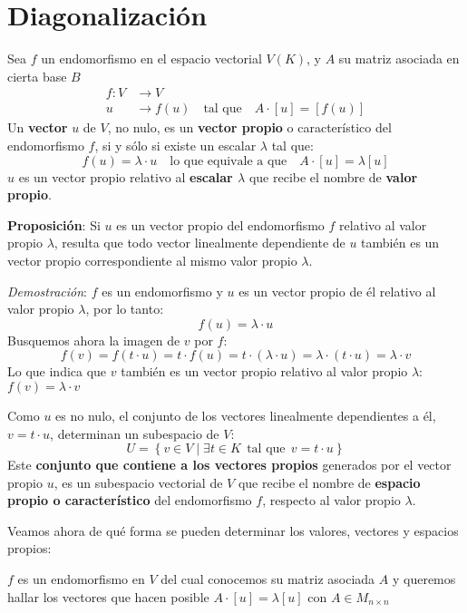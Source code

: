 \section{Diagonalización}

Sea \(f\) un endomorfismo en el espacio vectorial \(V(K)\), y \(A\) su matriz asociada en cierta base \(B\)
\begin{align*}
  f:V&\rightarrow V \\
  u &\rightarrow f(u) \quad \text{tal que} \quad A\cdot [u] = [f(u)]
\end{align*}
Un \textbf{vector} \(u\) de \(V\), no nulo, es un \textbf{vector propio} o característico del endomorfismo \(f\), si y sólo si existe un escalar \(\lambda\) tal que:
\[
  f(u) = \lambda \cdot u \quad \text{lo que equivale a que} \quad A \cdot [u] = \lambda[u]
\]
\(u\) es un vector propio relativo al \textbf{escalar \(\lambda\)} que recibe el nombre de \textbf{valor propio}.

\textbf{Proposición}: Si \(u\) es un vector propio del endomorfismo \(f\) relativo al valor propio \(\lambda\), resulta que todo vector linealmente dependiente de \(u\) también es un vector propio correspondiente al mismo valor propio \(\lambda\).

\textit{Demostración}: \(f\) es un endomorfismo y \(u\) es un vector propio de él relativo al valor propio \(\lambda\), por lo tanto:
\[
  f(u) = \lambda \cdot u
\]
Busquemos ahora la imagen de \(v\) por \(f\):
\[
  f(v) = f(t \cdot u) = t \cdot f(u) = t \cdot (\lambda \cdot u) = \lambda \cdot (t\cdot u) = \lambda \cdot v
\]
Lo que indica que \(v\) también es un vector propio relativo al valor propio \(\lambda\): \(f(v) = \lambda \cdot v\)

Como \(u\) es no nulo, el conjunto de los vectores linealmente dependientes a él, \(v = t \cdot u\), determinan un subespacio de \(V\):
\[
  U = \left\{v \in V \mid \exists t \in K ~~ \text{tal que} ~~ v = t\cdot u\right\}
\]
Este \textbf{conjunto que contiene a los vectores propios} generados por el vector propio \(u\), es un subespacio vectorial de \(V\) que recibe el nombre de \textbf{espacio propio o característico} del endomorfismo \(f\), respecto al valor propio \(\lambda\).

Veamos ahora de qué forma se pueden determinar los valores, vectores y espacios propios:

\(f\) es un endomorfismo en \(V\) del cual conocemos su matriz asociada \(A\) y queremos hallar los vectores que hacen posible \(A \cdot [u] = \lambda [u]\) con \(A\in M_{n\times n}\)


